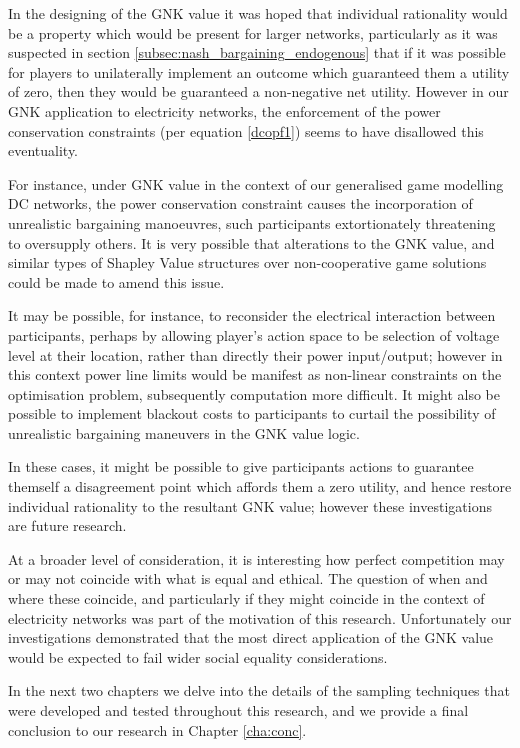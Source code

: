 In the designing of the GNK value it was hoped that individual rationality would be a property which would be present for larger networks, particularly as it was suspected in section \ref{subsec:nash_bargaining_endogenous} that if it was possible for players to unilaterally implement an outcome which guaranteed them a utility of zero, then they would be guaranteed a non-negative net utility.
However in our GNK application to electricity networks, the enforcement of the power conservation constraints (per equation \ref{dcopf1}) seems to have disallowed this eventuality.

For instance, under GNK value in the context of our generalised game modelling DC networks, the power conservation constraint causes the incorporation of unrealistic bargaining manoeuvres, such participants extortionately threatening to oversupply others.
It is very possible that alterations to the GNK value, and similar types of Shapley Value structures over non-cooperative game solutions could be made to amend this issue.

It may be possible, for instance, to reconsider the electrical interaction between participants, perhaps by allowing player's action space to be selection of voltage level at their location, rather than directly their power input/output; however in this context power line limits would be manifest as non-linear constraints on the optimisation problem, subsequently computation more difficult.
It might also be possible to implement blackout costs to participants to curtail the possibility of unrealistic bargaining maneuvers in the GNK value logic.

In these cases, it might be possible to give participants actions to guarantee themself a disagreement point which affords them a zero utility, and hence restore individual rationality to the resultant GNK value; however these investigations are future research.


At a broader level of consideration, it is interesting how perfect competition may or may not coincide with what is equal and ethical.
The question of when and where these coincide, and particularly if they might coincide in the context of electricity networks was part of the motivation of this research.
Unfortunately our investigations demonstrated that the most direct application of the GNK value would be expected to fail wider social equality considerations.

In the next two chapters we delve into the details of the sampling techniques that were developed and tested throughout this research, and we provide a final conclusion to our research in Chapter \ref{cha:conc}. 





